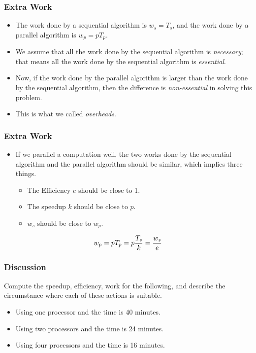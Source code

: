 \documentclass{beamer}
\begin{document}
\begin{CJK}{UTF8}{bsmi}
\begin{frame}
\frametitle{Extra Work}
\begin{itemize}
\item The work done by a sequential algorithm is $w_s = T_s$, and the work done by a parallel algorithm is $w_p = p T_p$.
\item We assume that all the work done by the sequential algorithm is {\em necessary}; that means all the work done by the sequential algorithm is {\em essential}.
\item Now, if the work done by the parallel algorithm is larger than the work done by the sequential algorithm, then the difference is {\em non-essential} in solving this problem.
\item This is what we called {\em overheads}.
\end{itemize}
\end{frame}


\begin{frame}
\frametitle{Extra Work}
\begin{itemize}
\item If we parallel a computation well, the two works done by the sequential algorithm and the parallel algorithm should be similar, which implies three things.
\begin{itemize}
\item The Efficiency $e$ should be close to 1.
\item The speedup $k$ should be close to $p$.
\item $w_s$ should be close to $w_p$.
\end{itemize}
\end{itemize}

\begin{equation}
w_p = p T_p = p {T_s \over k} = {w_s \over e}
\end{equation}
\end{frame}

\begin{frame}
\frametitle{Discussion} Compute the speedup, efficiency, work for the
following, and describe the circumstance where each of these actions is suitable.
\begin{itemize}
\item Using one processor and the time is 40 minutes.
\item Using two processors and the time is 24 minutes.
\item Using four processors and the time is 16 minutes.
\end{itemize}
\end{frame}


\end{CJK}
\end{document}
